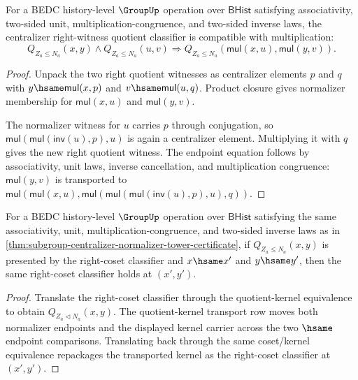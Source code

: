 \begin{theorem}
\label{thm:subgroup-centralizer-right-quotient-classifier-mul-compatible}
For a BEDC history-level $\GroupUp$ operation over $\mathsf{BHist}$
satisfying associativity, two-sided unit, multiplication-congruence, and
two-sided inverse laws, the centralizer right-witness quotient classifier is
compatible with multiplication:
$$
Q_{Z_a\leq N_a}(x,y)\land Q_{Z_a\leq N_a}(u,v)
\Longrightarrow Q_{Z_a\leq N_a}(\mathsf{mul}(x,u),\mathsf{mul}(y,v)).
$$
\end{theorem}
\begin{proof}
Unpack the two right quotient witnesses as centralizer elements $p$ and $q$
with $y\hsame\mathsf{mul}(x,p)$ and
$v\hsame\mathsf{mul}(u,q)$. Product closure gives normalizer membership for
$\mathsf{mul}(x,u)$ and $\mathsf{mul}(y,v)$.

The normalizer witness for $u$ carries $p$ through conjugation, so
$\mathsf{mul}(\mathsf{mul}(\mathsf{inv}(u),p),u)$ is again a centralizer
element. Multiplying it with $q$ gives the new right quotient witness. The
endpoint equation follows by associativity, unit laws, inverse cancellation,
and multiplication congruence:
$\mathsf{mul}(y,v)$ is transported to
$\mathsf{mul}(\mathsf{mul}(x,u),
\mathsf{mul}(\mathsf{mul}(\mathsf{mul}(\mathsf{inv}(u),p),u),q))$.
\end{proof}

\begin{theorem}
\label{thm:subgroup-centralizer-right-coset-classifier-hsame-transport}
For a BEDC history-level $\GroupUp$ operation over $\mathsf{BHist}$
satisfying the same associativity, unit, multiplication-congruence, and
two-sided inverse laws as in
\autoref{thm:subgroup-centralizer-normalizer-tower-certificate}, if
$Q_{Z_a\leq N_a}(x,y)$ is presented by the right-coset classifier and
$x\hsame x'$ and $y\hsame y'$, then the same right-coset classifier holds at
$(x',y')$.
\end{theorem}
\begin{proof}
Translate the right-coset classifier through the quotient-kernel equivalence
to obtain $Q_{Z_a\triangleleft N_a}(x,y)$. The quotient-kernel transport row
moves both normalizer endpoints and the displayed kernel carrier across the
two $\hsame$ endpoint comparisons. Translating back through the same
coset/kernel equivalence repackages the transported kernel as the
right-coset classifier at $(x',y')$.
\end{proof}


